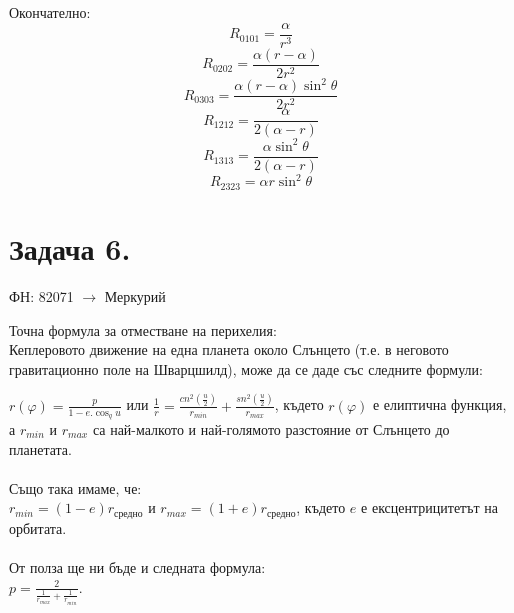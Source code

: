 \documentclass[a4paper,12pt]{article}
\begin{document}
    Окончателно: 
    \begin{equation*}
        R_{0101} = \frac{\alpha}{r^3} 
    \end{equation*}
    \begin{equation*}
        R_{0202} = \frac{\alpha(r-\alpha)}{2r^2} 
    \end{equation*}
    \begin{equation*}
        R_{0303} = \frac{\alpha(r-\alpha)\sin^2\theta}{2r^2} 
    \end{equation*}
    \begin{equation*}
        R_{1212} = \frac{\alpha}{2(\alpha-r)} 
    \end{equation*}
    \begin{equation*}
        R_{1313} = \frac{\alpha\sin^2\theta}{2(\alpha-r)} 
    \end{equation*}
    \begin{equation*}
        R_{2323} = \alpha r\sin^2\theta
    \end{equation*}

    \pagebreak
    \section*{Задача 6.}
    ФН: 82071 $\rightarrow$ Меркурий

    Точна формула за отместване на перихелия: \\
    Кеплеровото движение на една планета около Слънцето (т.е. в неговото гравитационно поле на Шварцшилд), може да се даде със следните 
    формули:

    $
        r(\varphi) = \frac{p}{1-e.\cos_q u}
    $
    или 
    $
        \frac{1}{r} = \frac{cn^2(\frac{u}{2})}{r_{min}} + \frac{sn^2(\frac{u}{2})}{r_{max}}
    $, 
    където $r(\varphi)$ е елиптична функция, а $r_{min}$ и $r_{max}$ са най-малкото и най-голямото
    разстояние от Слънцето до планетата. \\ \\
    Също така имаме, че: \\
    $
        r_{min} = (1-e)r_{\text{средно}}
    $ и 
    $
        r_{max}=(1+e)r_{\text{средно}}
    $, където $e$ е ексцентрицитетът на орбитата. \\
    \\ От полза ще ни бъде и следната формула: \\
    $p = \frac{2}{\frac{1}{r_{max}} + \frac{1}{r_{min}}}$. \\
\end{document}
